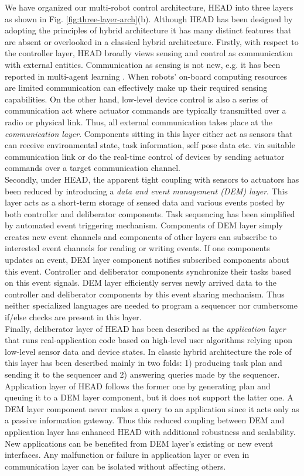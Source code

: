 \documentclass{ifacconf}
\begin{document}
We have organized our  multi-robot control architecture, HEAD into three layers as shown in Fig. \ref{fig:three-layer-arch}(b). Although HEAD has been designed by adopting the principles of hybrid architecture it has many distinct features that are absent or overlooked in a classical hybrid architecture. Firstly, with respect to the controller layer, HEAD broadly views sensing and control as communication with external entities. Communication as sensing is not new, e.g. it has been reported in multi-agent learning \citep{Mataric1998}. When robots' on-board computing resources are limited communication can effectively make up their required sensing capabilities. On the other hand, low-level device control is also a series of communication act where actuator commands are typically transmitted over a radio or physical link. Thus, all external communication takes place at the {\em communication layer}. Components sitting in this layer either act as sensors that can receive environmental state, task information, self pose data etc. via suitable communication link or do the real-time control of devices by sending actuator commands over a target communication channel. \\
Secondly, under HEAD, the apparent tight coupling with sensors to actuators has been reduced by introducing a {\em data and event management (DEM) layer}. This layer acts as a short-term storage of sensed data and various events posted by both controller and deliberator components. Task sequencing has been simplified by automated event triggering mechanism. Components of DEM layer simply creates new event channels and  components of other layers can subscribe to interested event channels for reading or writing events. If one components updates an event, DEM layer component notifies subscribed components about this event. Controller and deliberator components synchronize their tasks based on this event signals. DEM layer efficiently serves newly arrived data to the controller and deliberator components by this event sharing mechanism. Thus neither specialized languages are needed to program a sequencer nor cumbersome if/else checks are present in this layer.\\
Finally, deliberator layer of HEAD has been described as the {\em application layer} that runs real-application code based on high-level user algorithms relying upon low-level sensor data and device states. In classic hybrid architecture the role of this layer has been described mainly in two folds: 1) producing task plan and sending it to the sequencer and 2) answering queries made by the sequencer. Application layer of HEAD follows the former one by generating plan and queuing it to a DEM layer component, but it does not support the latter one. A DEM layer component never makes a query to an application since it acts only as a passive information gateway. Thus this reduced coupling between DEM and application layer has enhanced HEAD with additional robustness and scalability. New applications can be benefited from DEM layer's existing or new event interfaces. Any malfunction or failure in application layer or even in communication layer can be isolated without affecting others. 
\end{document}
